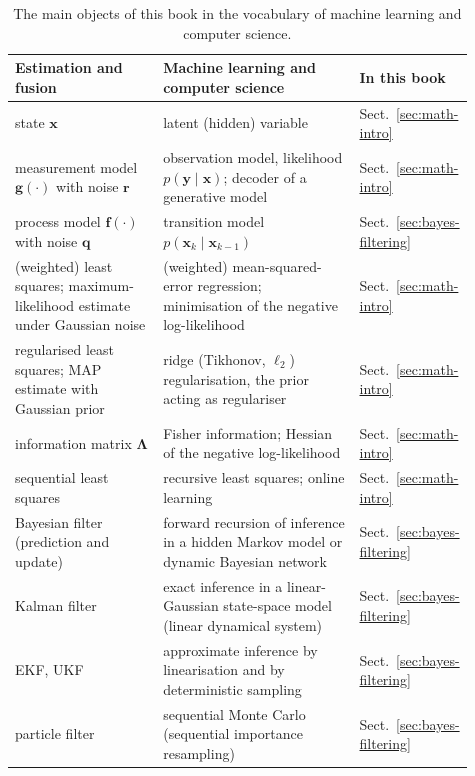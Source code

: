 \begin{addedblock}
\begin{table}[!t]
    \centering
    \footnotesize
    \setlength{\tabcolsep}{4pt}
    \caption{The main objects of this book in the vocabulary of machine learning and computer science.}
    \label{tab:ml-dictionary}
    \begin{tabular}{>{\raggedright\arraybackslash}p{0.33\linewidth} >{\raggedright\arraybackslash}p{0.44\linewidth} >{\raggedright\arraybackslash}p{0.14\linewidth}}
        \hline
        \textbf{Estimation and fusion} & \textbf{Machine learning and computer science} & \textbf{In this book} \\
        \hline
        state $\mathbf{x}$ & latent (hidden) variable & Sect.~\ref{sec:math-intro} \\
        measurement model $\mathbf{g}(\cdot)$ with noise $\mathbf{r}$ & observation model, likelihood $p(\mathbf{y}\mid\mathbf{x})$; decoder of a generative model & Sect.~\ref{sec:math-intro} \\
        process model $\mathbf{f}(\cdot)$ with noise $\mathbf{q}$ & transition model $p(\mathbf{x}_k\mid\mathbf{x}_{k-1})$ & Sect.~\ref{sec:bayes-filtering} \\
        (weighted) least squares; maximum-likelihood estimate under Gaussian noise & (weighted) mean-squared-error regression; minimisation of the negative log-likelihood & Sect.~\ref{sec:math-intro} \\
        regularised least squares; MAP estimate with Gaussian prior & ridge (Tikhonov, $\ell_2$) regularisation, the prior acting as regulariser & Sect.~\ref{sec:math-intro} \\
        information matrix $\mathbf{\Lambda}$ & Fisher information; Hessian of the negative log-likelihood & Sect.~\ref{sec:math-intro} \\
        sequential least squares & recursive least squares; online learning & Sect.~\ref{sec:math-intro} \\
        Bayesian filter (prediction and update) & forward recursion of inference in a hidden Markov model or dynamic Bayesian network & Sect.~\ref{sec:bayes-filtering} \\
        Kalman filter & exact inference in a linear-Gaussian state-space model (linear dynamical system) & Sect.~\ref{sec:bayes-filtering} \\
        EKF, UKF & approximate inference by linearisation and by deterministic sampling & Sect.~\ref{sec:bayes-filtering} \\
        particle filter & sequential Monte Carlo (sequential importance resampling) & Sect.~\ref{sec:bayes-filtering} \\

\end{tabular}
\end{table}
\end{addedblock}
